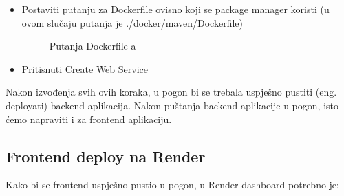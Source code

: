\begin{itemize}
                    \item Postaviti putanju za Dockerfile ovisno koji se package manager koristi (u ovom slučaju putanja je ./docker/maven/Dockerfile)
                    \begin{figure}[H]
    			\centering
    			\caption{Putanja Dockerfile-a}
    			\label{fig:dockerFilePath}
    			\end{figure}
                    \item Pritisnuti Create Web Service
                \end{itemize}

                Nakon izvođenja svih ovih koraka, u pogon bi se trebala uspješno pustiti (eng. deployati) backend aplikacija. Nakon puštanja backend aplikacije u pogon, isto ćemo napraviti i za frontend aplikaciju.

                \eject

                \subsection{Frontend deploy na Render}

                Kako bi se frontend uspješno pustio u pogon, u Render dashboard potrebno je:

